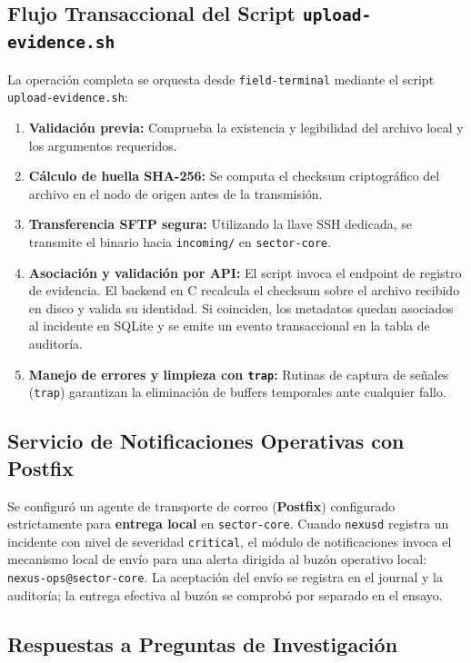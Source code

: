 \documentclass[10pt,a4paper]{article}
\begin{document}
\subsection{Flujo Transaccional del Script \texttt{upload-evidence.sh}}

La operación completa se orquesta desde \texttt{field-terminal} mediante el script \texttt{upload-evidence.sh}:
\begin{enumerate}[leftmargin=*]
    \item \textbf{Validación previa:} Comprueba la existencia y legibilidad del archivo local y los argumentos requeridos.
    \item \textbf{Cálculo de huella SHA-256:} Se computa el checksum criptográfico del archivo en el nodo de origen antes de la transmisión.
    \item \textbf{Transferencia SFTP segura:} Utilizando la llave SSH dedicada, se transmite el binario hacia \texttt{incoming/} en \texttt{sector-core}.
    \item \textbf{Asociación y validación por API:} El script invoca el endpoint de registro de evidencia. El backend en C recalcula el checksum sobre el archivo recibido en disco y valida su identidad. Si coinciden, los metadatos quedan asociados al incidente en SQLite y se emite un evento transaccional en la tabla de auditoría.
    \item \textbf{Manejo de errores y limpieza con \texttt{trap}:} Rutinas de captura de señales (\texttt{trap}) garantizan la eliminación de buffers temporales ante cualquier fallo.
\end{enumerate}

\subsection{Servicio de Notificaciones Operativas con Postfix}

Se configuró un agente de transporte de correo (\textbf{Postfix}) configurado estrictamente para \textbf{entrega local} en \texttt{sector-core}. Cuando \texttt{nexusd} registra un incidente con nivel de severidad \texttt{critical}, el módulo de notificaciones invoca el mecanismo local de envío para una alerta dirigida al buzón operativo local: \texttt{nexus-ops@sector-core}. La aceptación del envío se registra en el journal y la auditoría; la entrega efectiva al buzón se comprobó por separado en el ensayo.

\subsection{Respuestas a Preguntas de Investigación}
\end{document}
